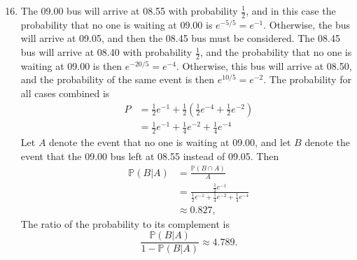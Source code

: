 \documentclass[a4paper,12pt]{article}
\begin{document}
\begin{enumerate}
	\setcounter{enumi}{15}
	\item The 09.00 bus will arrive at 08.55 with probability $\frac{1}{2}$, and in this case the probability that no one is waiting at 09.00 is $e^{-5/5} = e^{-1}$. Otherwise, the bus will arrive at 09.05, and then the 08.45 bus must be considered. The 08.45 bus will arrive at 08.40 with probability $\frac{1}{2}$, and the probability that no one is waiting at 09.00 is then $e^{-20/5} = e^{-4}$. Otherwise, this bus will arrive at 08.50, and the probability of the same event is then $e^{10/5} = e^{-2}$. The probability for all cases combined is
	\begin{align*}
		P &= \frac{1}{2} e^{-1} + \frac{1}{2} \left( \frac{1}{2} e^{-4} + \frac{1}{2} e^{-2} \right) \\
		&= \frac{1}{2} e^{-1} + \frac{1}{4} e^{-2} + \frac{1}{4} e^{-4}
	\end{align*}
	Let $A$ denote the event that no one is waiting at 09.00, and let $B$ denote the event that the 09.00 bus left at 08.55 instead of 09.05. Then
	\begin{align*}
		\mathbb{P}(B | A) &= \frac{\mathbb{P}(B \cap A)}{A} \\
		&= \frac{\frac{1}{2} e^{-1}}{\frac{1}{2} e^{-1} + \frac{1}{4} e^{-2} + \frac{1}{4} e^{-4}} \\
		&\approx 0.827,
	\end{align*}
	The ratio of the probability to its complement is
	\[ \frac{\mathbb{P}(B | A)}{1 - \mathbb{P}(B | A)} \approx 4.789. \]


\end{enumerate}
\end{document}
